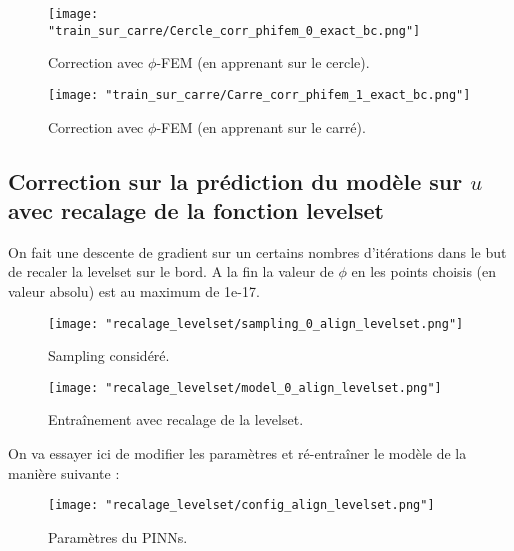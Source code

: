 \begin{minipage}{0.48\linewidth}
	\begin{figure}[H]
		\centering
		\texttt{[image: "train\_sur\_carre/Cercle\_corr\_phifem\_0\_exact\_bc.png"]}
		\caption{Correction avec $\phi$-FEM (en apprenant sur le cercle).}
		\label{Cercle_corr_phifem_0_exact_bc}
	\end{figure}
\end{minipage}
\begin{minipage}{0.48\linewidth}
	\begin{figure}[H]
		\centering
		\texttt{[image: "train\_sur\_carre/Carre\_corr\_phifem\_1\_exact\_bc.png"]}
		\caption{Correction avec $\phi$-FEM (en apprenant sur le carré).}
		\label{Carre_corr_phifem_1_exact_bc}
	\end{figure}
\end{minipage}



\subsection{Correction sur la prédiction du modèle sur $u$ avec recalage de la fonction levelset}

On fait une descente de gradient sur un certains nombres d'itérations dans le but de recaler la levelset sur le bord. A la fin la valeur de $\phi$ en les points choisis (en valeur absolu) est au maximum de 1e-17.

\begin{minipage}{0.48\linewidth}
	\begin{figure}[H]
		\centering
		\texttt{[image: "recalage\_levelset/sampling\_0\_align\_levelset.png"]}
		\caption{Sampling considéré.}
		\label{sampling_0_align_levelset}
	\end{figure}
\end{minipage}
\begin{minipage}{0.48\linewidth}
	\begin{figure}[H]
		\centering
		\texttt{[image: "recalage\_levelset/model\_0\_align\_levelset.png"]}
		\caption{Entraînement avec recalage de la levelset.}
		\label{model_0_align_levelset}
	\end{figure}
\end{minipage}

On va essayer ici de modifier les paramètres et ré-entraîner le modèle de la manière suivante :

\begin{figure}[H]
	\centering
	\texttt{[image: "recalage\_levelset/config\_align\_levelset.png"]}
	\caption{Paramètres du PINNs.}
	\label{config_align_levelset}
\end{figure}

